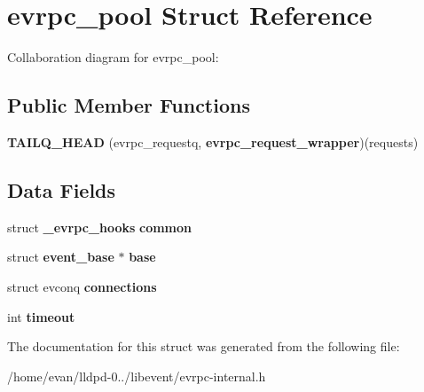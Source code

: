 \section{evrpc\-\_\-pool \-Struct \-Reference}
\label{structevrpc__pool}


\-Collaboration diagram for evrpc\-\_\-pool\-:
\subsection*{\-Public \-Member \-Functions}
\begin{DoxyCompactItemize}
\item 
{\bfseries \-T\-A\-I\-L\-Q\-\_\-\-H\-E\-A\-D} (evrpc\-\_\-requestq, {\bf evrpc\-\_\-request\-\_\-wrapper})(requests)\label{structevrpc__pool_a7068687280e2bed2e054f78346fd6e62}

\end{DoxyCompactItemize}
\subsection*{\-Data \-Fields}
\begin{DoxyCompactItemize}
\item 
struct {\bf \-\_\-evrpc\-\_\-hooks} {\bfseries common}\label{structevrpc__pool_a8f090a8ffe0506f6544e22517e94b6cb}

\item 
struct {\bf event\-\_\-base} $\ast$ {\bfseries base}\label{structevrpc__pool_ab1a154f7530a81e9dd1d63fc6b98a5c7}

\item 
struct evconq {\bfseries connections}\label{structevrpc__pool_abbb65a1d20c79df1e0d3647099ed6b95}

\item 
int {\bfseries timeout}\label{structevrpc__pool_a493b57f443cc38b3d3df9c1e584d9d82}

\end{DoxyCompactItemize}


\-The documentation for this struct was generated from the following file\-:\begin{DoxyCompactItemize}
\item 
/home/evan/lldpd-\/0../libevent/evrpc-\/internal.\-h\end{DoxyCompactItemize}
